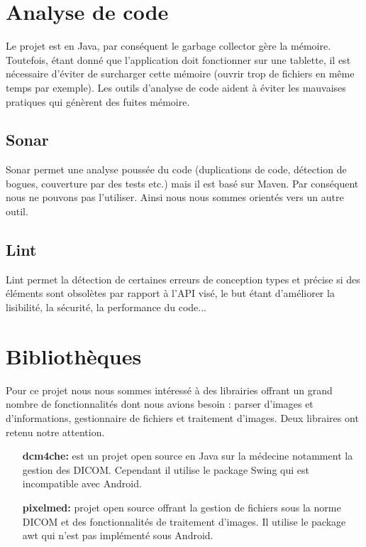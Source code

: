 \section{Analyse de code}

Le projet est en Java, par conséquent le garbage collector gère la mémoire. Toutefois, étant donné que l'application doit 
fonctionner sur une tablette, il est nécessaire d'éviter de surcharger cette mémoire (ouvrir trop de fichiers en même temps par exemple). Les outils d'analyse de code aident à éviter les mauvaises pratiques qui génèrent des fuites mémoire.
\subsection{Sonar}
Sonar permet une analyse poussée du code (duplications de code, détection de bogues, couverture par des tests etc.) mais il est basé sur Maven. Par conséquent nous ne pouvons pas l'utiliser. Ainsi nous nous sommes orientés vers un autre outil.

\subsection{Lint}
Lint permet la détection de certaines erreurs de conception types et précise si des éléments sont
obsolètes par rapport à l'API visé, le but étant d'améliorer la lisibilité, la sécurité, la performance du code...

\section{Bibliothèques}
Pour ce projet nous nous sommes intéressé à des librairies offrant un grand nombre de fonctionnalités dont nous avions besoin : parser d'images et d'informations, gestionnaire de fichiers et traitement d'images. Deux libraires ont retenu notre attention.
\begin{itemize}
\item[\textbf{dcm4che:}]  est un projet open source en Java sur la médecine notamment la gestion des DICOM. Cependant il utilise le package Swing qui est incompatible avec Android.
\item[\textbf{pixelmed:}] projet open source offrant la gestion de fichiers sous la norme DICOM et des fonctionnalités de traitement d'images. Il utilise le package awt qui n'est pas implémenté sous 
Android.
\end{itemize}